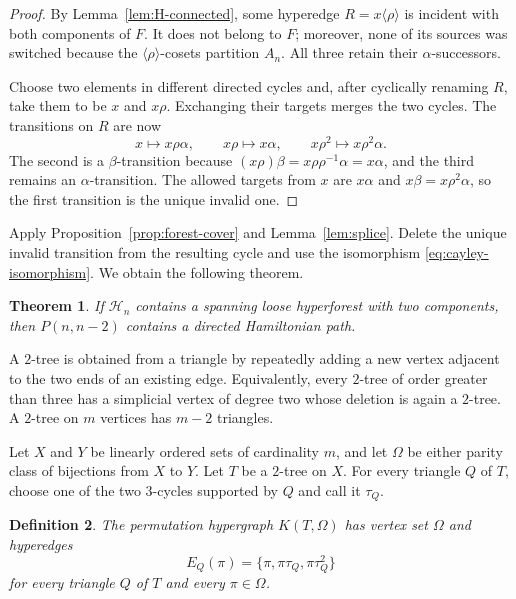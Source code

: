 \documentclass[4pt]{article} %
\newtheorem{theorem}{Theorem}[section]
\newtheorem{definition}[theorem]{Definition}
\newcommand{\la}{\langle}
\newcommand{\ra}{\rangle}
\begin{document}
\begin{proof}
By Lemma~\ref{lem:H-connected}, some hyperedge
$R=x\la\rho\ra$ is incident with both components of $F$. It does not belong
to $F$; moreover, none of its sources was switched because the
$\la\rho\ra$-cosets partition $A_n$. All three retain their
$\alpha$-successors.

Choose two elements in different directed cycles and, after cyclically
renaming $R$, take them to be $x$ and $x\rho$. Exchanging their targets
merges the two cycles. The transitions on $R$ are now
\[
 x\longmapsto x\rho\alpha,\qquad
 x\rho\longmapsto x\alpha,\qquad
 x\rho^2\longmapsto x\rho^2\alpha.
\]
The second is a $\beta$-transition because
$(x\rho)\beta=x\rho\rho^{-1}\alpha=x\alpha$, and the third remains an
$\alpha$-transition. The allowed targets from $x$ are $x\alpha$ and
$x\beta=x\rho^2\alpha$, so the first transition is the unique invalid one.
\end{proof}
Apply Proposition~\ref{prop:forest-cover} and Lemma~\ref{lem:splice}. Delete
the unique invalid transition from the resulting cycle and use the
isomorphism \eqref{eq:cayley-isomorphism}.
We obtain the following theorem.
\begin{theorem}\label{thm:reduction}
If $\mathcal H_n$ contains a spanning loose hyperforest with two components,
then $P(n,n-2)$ contains a directed Hamiltonian path.
\end{theorem}

A $2$-tree is obtained from a triangle by repeatedly adding a new vertex
adjacent to the two ends of an existing edge. Equivalently, every $2$-tree
of order greater than three has a simplicial vertex of degree two whose
deletion is again a $2$-tree. A $2$-tree on $m$ vertices has $m-2$
triangles.

Let $X$ and $Y$ be linearly ordered sets of cardinality $m$, and let
$\Omega$ be either parity class of bijections from $X$ to $Y$. Let $T$ be a
$2$-tree on $X$. For every triangle $Q$ of $T$, choose one of the two
$3$-cycles supported by $Q$ and call it $\tau_Q$.

\begin{definition}\label{def:permutation-hypergraph}
The permutation hypergraph $K(T,\Omega)$ has vertex set $\Omega$ and
hyperedges
\begin{equation}\label{eq:permutation-edge}
 E_Q(\pi)=\{\pi,\pi\tau_Q,\pi\tau_Q^2\}
\end{equation}
for every triangle $Q$ of $T$ and every $\pi\in\Omega$.
\end{definition}
\end{document}
